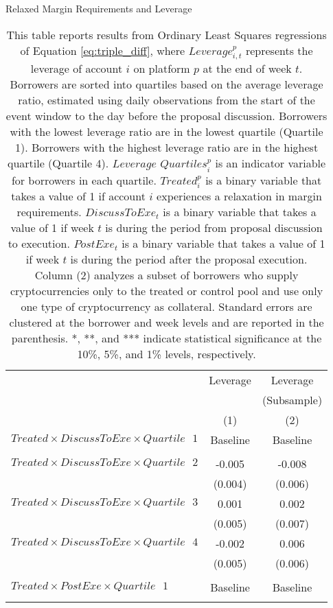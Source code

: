 \begin{table}[ht!]
\end{table}%

\clearpage
\newpage



    
\begin{table}[ht!]
\caption{Relaxed Margin Requirements and Leverage }\label{tab:hetero_lev}
\caption*{ This table reports results from Ordinary Least Squares regressions of Equation \ref{eq:triple_diff}, where $Leverage_{i,t}^p$ represents the leverage of account $i$ on platform $p$ at the end of week $t$. Borrowers are sorted into quartiles based on the average leverage ratio, estimated using daily observations from the start of the event window to the day before the proposal discussion. Borrowers with the lowest leverage ratio are in the lowest quartile (Quartile 1). Borrowers with the highest leverage ratio are in the highest quartile (Quartile 4). $\textit{Leverage Quartiles}_{i}^p$ is an indicator variable for borrowers in each quartile. $Treated_{i}^{p}$ is a binary variable that takes a value of 1 if account $i$ experiences a relaxation in margin requirements. $DiscussToExe_t$ is a binary variable that takes a value of 1 if week $t$ is during the period from proposal discussion to execution. $PostExe_t$ is a binary variable that takes a value of 1 if week $t$ is during the period after the proposal execution. Column (2) analyzes a subset of borrowers who supply cryptocurrencies only to the treated or control pool and use only one type of cryptocurrency as collateral. Standard errors are clustered at the borrower and week levels and are reported in the parenthesis. *, **, and *** indicate statistical significance at the 10\%, 5\%, and 1\% levels, respectively.}


\centering
\def\sym#1{\ifmmode^{#1}\else\(^{#1}\)\fi}


\begin{tabular*}{\linewidth}{@{\extracolsep{\fill}}lcc }
     \toprule
          & Leverage & Leverage \\
          &       & (Subsample) \\
          & (1)   & (2) \\
\cmidrule{2-3}    $Treated \times DiscussToExe \times Quartile\text{ }1$ & Baseline     & Baseline \\
& & \\
     $Treated \times DiscussToExe \times Quartile\text{ }2$  & -0.005 & -0.008 \\
          & (0.004) & (0.006) \\[2pt]
     $Treated \times DiscussToExe \times Quartile\text{ }3$ & 0.001 & 0.002 \\
          & (0.005) & (0.007) \\[2pt]
    $Treated \times DiscussToExe \times Quartile\text{ }4$  & -0.002 & 0.006 \\
          & (0.005) & (0.006) \\[2pt]
          & & \\
    $Treated \times PostExe \times Quartile\text{ }1$ & Baseline     & Baseline \\
    & & \\


\end{tabular*}
\end{table}
